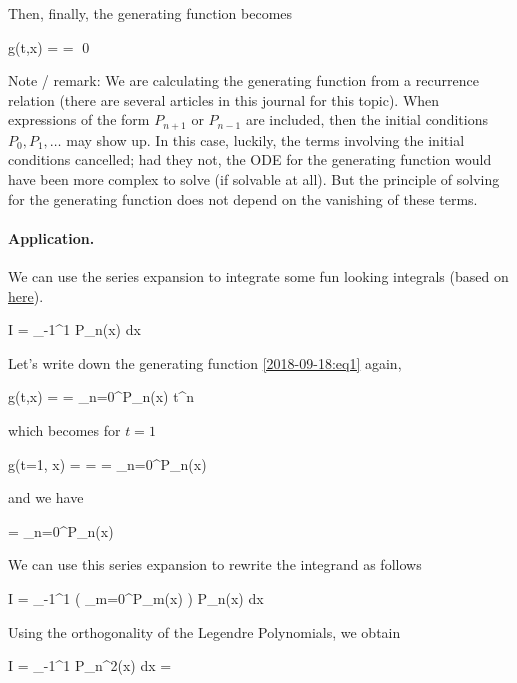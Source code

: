 Then, finally, the generating function becomes

\bee
g(t,x) = \exp \ln {} =  \qed
\eee

Note / remark: We are calculating the generating function from a recurrence relation (there are several articles in this journal for this topic). When expressions of the form $P_{n+1}$ or $P_{n-1}$ are included, then the initial conditions $P_0, P_1, \ldots$ may show up. In this case, luckily, the terms involving the initial conditions cancelled; had they not, the ODE for the generating function would have been more complex to solve (if solvable at all). But the principle of solving for the generating function does not depend on the vanishing of these terms.


\paragraph{Application.} We can use the series expansion to integrate some fun looking integrals (based on \href{https://math.stackexchange.com/questions/1611224/calculating-i-int-11-dfrac1-sqrt1-xp-nx-dx-where-p-n-is-a?rq=1}{here}).

\bee
I = \int_{-1}^1  P_n(x) dx
\eee

Let's write down the generating function \eqref{2018-09-18:eq1} again,

\bee
g(t,x) =  = \sum_{n=0}^\infty P_n(x) t^n
\eee

which becomes for $t=1$

\bee
g(t=1, x) =  =   = \sum_{n=0}^\infty P_n(x)
\eee

and we have

\bee
{} =  \sum_{n=0}^\infty P_n(x)
\eee

We can use this series expansion to rewrite the integrand as follows

\bee
I =  \int_{-1}^1 \left( \sum_{m=0}^\infty P_m(x) \right) P_n(x) dx
\eee

Using the orthogonality of the Legendre Polynomials, we obtain

\bee
I =  \int_{-1}^1 P_n^2(x) dx = 
\eee



